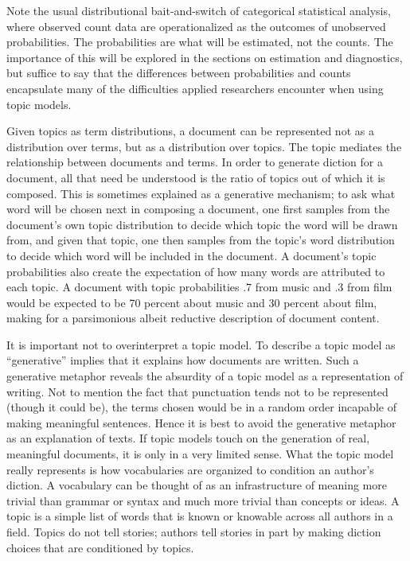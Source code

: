 \documentclass[]{book}
\theoremstyle{definition}
\theoremstyle{definition}
\theoremstyle{definition}
\theoremstyle{remark}
\begin{document}
Note the usual distributional bait-and-switch of categorical statistical
analysis, where observed count data are operationalized as the outcomes
of unobserved probabilities. The probabilities are what will be
estimated, not the counts. The importance of this will be explored in
the sections on estimation and diagnostics, but suffice to say that the
differences between probabilities and counts encapsulate many of the
difficulties applied researchers encounter when using topic models.

Given topics as term distributions, a document can be represented not as
a distribution over terms, but as a distribution over topics. The topic
mediates the relationship between documents and terms. In order to
generate diction for a document, all that need be understood is the
ratio of topics out of which it is composed. This is sometimes explained
as a generative mechanism; to ask what word will be chosen next in
composing a document, one first samples from the document's own topic
distribution to decide which topic the word will be drawn from, and
given that topic, one then samples from the topic's word distribution to
decide which word will be included in the document. A document's topic
probabilities also create the expectation of how many words are
attributed to each topic. A document with topic probabilities .7 from
music and .3 from film would be expected to be 70 percent about music
and 30 percent about film, making for a parsimonious albeit reductive
description of document content.

It is important not to overinterpret a topic model. To describe a topic
model as ``generative'' implies that it explains how documents are
written. Such a generative metaphor reveals the absurdity of a topic
model as a representation of writing. Not to mention the fact that
punctuation tends not to be represented (though it could be), the terms
chosen would be in a random order incapable of making meaningful
sentences. Hence it is best to avoid the generative metaphor as an
explanation of texts. If topic models touch on the generation of real,
meaningful documents, it is only in a very limited sense. What the topic
model really represents is how vocabularies are organized to condition
an author's diction. A vocabulary can be thought of as an infrastructure
of meaning more trivial than grammar or syntax and much more trivial
than concepts or ideas. A topic is a simple list of words that is known
or knowable across all authors in a field. Topics do not tell stories;
authors tell stories in part by making diction choices that are
conditioned by topics.
\end{document}
